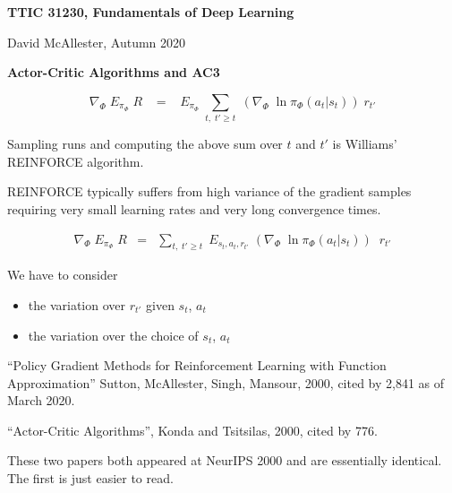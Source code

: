 




{\Huge

  \centerline{\bf TTIC 31230, Fundamentals of Deep Learning}
  \bigskip
  \centerline{David McAllester, Autumn 2020}
  \vfill
  \centerline{\bf Actor-Critic Algorithms and AC3}
  \vfill
  \vfill  

$$\nabla_\Phi \;E_{\pi_\Phi}\;R \;\;\; = \;\;\; E_{\pi_\Phi}\; \sum_{t,\;t' \geq t} \; \left(\nabla_\Phi\;\ln \pi_\Phi(a_t|s_t)\right) \;r_{t'}$$

\vfill
Sampling runs and computing the above sum over $t$ and $t'$ is Williams' REINFORCE algorithm.


REINFORCE typically suffers from high variance of the gradient samples requiring very small learning rates and very long convergence times.

\begin{eqnarray*}
    \nabla_\Phi \; E_{\pi_\Phi}\; R  & = & \sum_{t,\;t'\geq t}\; E_{s_t,a_t,r_{t'}}\; \left(\nabla_\Phi\;\ln \pi_\Phi(a_{t}|s_{t})\right)\;\;r_{t'}
\end{eqnarray*}

\vfill
We have to consider
\begin{itemize}
\item {\color{red} the variation over $r_{t'}$ given $s_t$, $a_t$}
\item {\color{red} the variation over the choice of $s_t$, $a_t$}
\end{itemize}


``Policy Gradient Methods for
Reinforcement Learning with Function
Approximation'' Sutton, McAllester, Singh, Mansour, 2000, cited by 2,841 as of March 2020.

\vfill
``Actor-Critic Algorithms'', Konda and Tsitsilas, 2000, cited by 776.

\vfill
These two papers both appeared at NeurIPS 2000 and are essentially identical.  The first is just easier to read.



}

